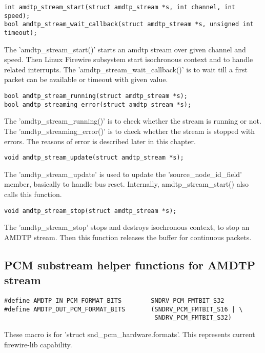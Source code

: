 \documentclass[onecolumn]{article}
\begin{document}
\begin{verbatim}
int amdtp_stream_start(struct amdtp_stream *s, int channel, int speed);
bool amdtp_stream_wait_callback(struct amdtp_stream *s, unsigned int timeout);
\end{verbatim}

The 'amdtp\_stream\_start()' starts an amdtp stream over given channel and speed. Then Linux Firewire subsystem start isochronous context and to handle related interrupts. The 'amdtp\_stream\_wait\_callback()' is to wait till a first packet can be available or timeout with given value.

\begin{verbatim}
bool amdtp_stream_running(struct amdtp_stream *s);
bool amdtp_streaming_error(struct amdtp_stream *s);
\end{verbatim}

The 'amdtp\_stream\_running()' is to check whether the stream is running or not. The 'amdtp\_streaming\_error()' is to check whether the stream is stopped with errors. The reasons of error is described later in this chapter.

\begin{verbatim}
void amdtp_stream_update(struct amdtp_stream *s);
\end{verbatim}

The 'amdtp\_stream\_update' is used to update the 'source\_node\_id\_field' member, basically to handle bus reset. Internally, amdtp\_stream\_start() also calls this function.

\begin{verbatim}
void amdtp_stream_stop(struct amdtp_stream *s);
\end{verbatim}

The 'amdtp\_stream\_stop' stops and destroys isochronous context, to stop an AMDTP stream. Then this function releases the buffer for continuous packets.

\subsection{PCM substream helper functions for AMDTP stream}

\begin{verbatim}
#define AMDTP_IN_PCM_FORMAT_BITS        SNDRV_PCM_FMTBIT_S32
#define AMDTP_OUT_PCM_FORMAT_BITS       (SNDRV_PCM_FMTBIT_S16 | \
                                         SNDRV_PCM_FMTBIT_S32)
\end{verbatim}

These macro is for 'struct snd\_pcm\_hardware.formats'. This represents current firewire-lib capability.
\end{document}
